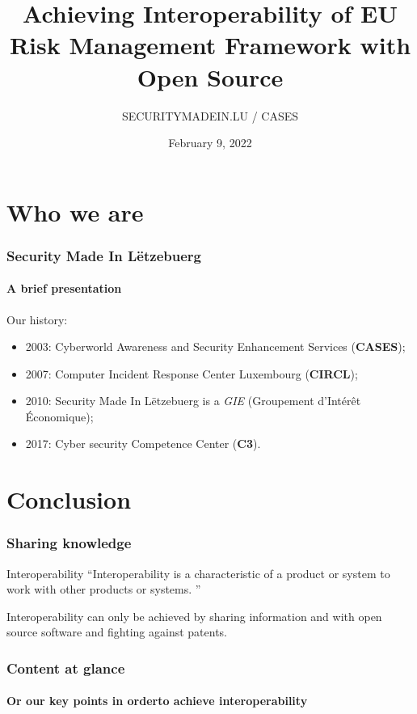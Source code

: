 \documentclass[]{beamer}
\title[EU Risk Management Framework]{Achieving Interoperability of EU Risk Management Framework with Open Source}
\author[Team CASES]{SECURITYMADEIN.LU / CASES}
\institute[]{\href{https://www.cases.lu}{Cyberworld Awareness and Security Enhancements Services}}
\date{February 9, 2022}
\begin{document}
\begin{frame}
  \titlepage
\end{frame}


%
%
\section*{Who we are}
\begin{frame}
  \frametitle{Security Made In Lëtzebuerg}
  \framesubtitle{A brief presentation}
  Our history:
  \begin{center}
    \begin{itemize}
      \item 2003: Cyberworld Awareness and Security Enhancement Services (\textbf{CASES});
      \item 2007: Computer Incident Response Center Luxembourg (\textbf{CIRCL});
      \item 2010: Security Made In Lëtzebuerg is a \textit{GIE} (Groupement d’Intérêt Économique);
      \item 2017: Cyber security Competence Center (\textbf{C3}).
    \end{itemize}
  \end{center}
\end{frame}


\section*{Conclusion}
\begin{frame}
  \frametitle{Sharing knowledge}
  \begin{block}{Interoperability}
    \textquotedblleft Interoperability is a characteristic of a product or system to work with other products or systems. \textquotedblright
  \end{block}
  \bigskip
  \begin{center}
    Interoperability can only be achieved by sharing information and with open source software and fighting against patents.
  \end{center}
\end{frame}


\setcounter{tocdepth}{1}
\begin{frame}
  \frametitle{Content at glance}
  \framesubtitle{Or our key points in orderto achieve interoperability}
  \tableofcontents
\end{frame}
\setcounter{tocdepth}{4}
\end{document}
